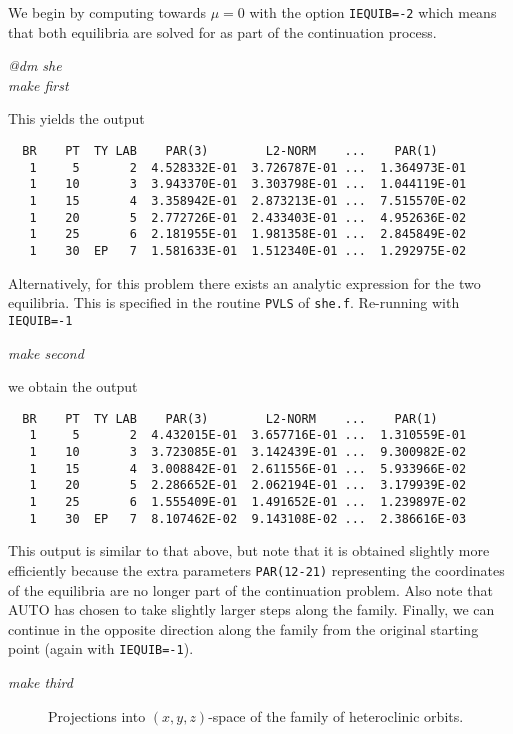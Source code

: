 \documentclass[12pt]{report}
\begin{document}
We begin by computing towards $\mu=0$ with the option {\tt IEQUIB=-2}
which means that both equilibria are solved for as part of
the continuation process.
\begin{center}
{\it @dm she} \\
{\it make first}
\end{center} 
This yields the output
\begin{verbatim}
  BR    PT  TY LAB    PAR(3)        L2-NORM    ...    PAR(1)     
   1     5       2  4.528332E-01  3.726787E-01 ...  1.364973E-01
   1    10       3  3.943370E-01  3.303798E-01 ...  1.044119E-01
   1    15       4  3.358942E-01  2.873213E-01 ...  7.515570E-02
   1    20       5  2.772726E-01  2.433403E-01 ...  4.952636E-02
   1    25       6  2.181955E-01  1.981358E-01 ...  2.845849E-02
   1    30  EP   7  1.581633E-01  1.512340E-01 ...  1.292975E-02
\end{verbatim}
Alternatively, for this problem there exists an analytic expression for
the two equilibria. This is specified in the routine {\tt PVLS} of
{\tt she.f}. Re-running with {\tt IEQUIB=-1}
\begin{center}
\it make second
\end{center} 
we obtain the output
\begin{verbatim}
  BR    PT  TY LAB    PAR(3)        L2-NORM    ...    PAR(1)     
   1     5       2  4.432015E-01  3.657716E-01 ...  1.310559E-01
   1    10       3  3.723085E-01  3.142439E-01 ...  9.300982E-02
   1    15       4  3.008842E-01  2.611556E-01 ...  5.933966E-02
   1    20       5  2.286652E-01  2.062194E-01 ...  3.179939E-02
   1    25       6  1.555409E-01  1.491652E-01 ...  1.239897E-02
   1    30  EP   7  8.107462E-02  9.143108E-02 ...  2.386616E-03
\end{verbatim}
This output is similar to that above, but note that it is obtained slightly
more efficiently because the extra parameters {\tt PAR(12-21)} representing the
coordinates of the equilibria are no longer
part of the continuation problem. Also note that {\cal AUTO} has chosen to take
slightly larger steps along the family. Finally, we can continue in the opposite
direction along the family from the original starting point (again with {\tt IEQUIB=-1}).
\begin{center}
\it make third
\end{center}
%
\begin{figure}[b]
\epsfysize 9.0cm
\centerline{}
\caption{Projections into $(x,y,z)$-space of the family of heteroclinic
orbits.}
\label{Fshear}
\end{figure}
\end{document}
